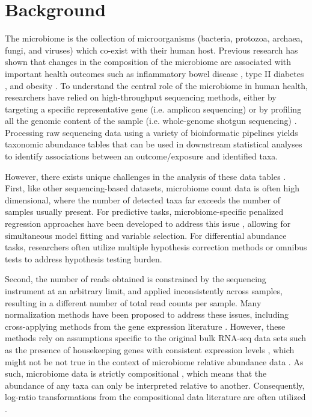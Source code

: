 \documentclass{article}
\begin{document}
\section*{Background}  
The microbiome is the collection of microorganisms (bacteria, protozoa, archaea, fungi, and viruses) which co-exist with their human host. Previous research has shown that changes in the composition of the microbiome are associated with important health outcomes such as inflammatory bowel disease \cite{proctor2019}, type II diabetes \cite{sharma2019}, and obesity \cite{aoun2020}. To understand the central role of the microbiome in human health, researchers have relied on high-throughput sequencing methods, either by targeting a specific representative gene (i.e. amplicon sequencing) or by profiling all the genomic content of the sample (i.e. whole-genome shotgun sequencing) \cite{cho2012}. Processing raw sequencing data using a variety of bioinformatic pipelines \cite{callahan2016,truong2015} yields taxonomic abundance tables that can be used in downstream statistical analyses to identify associations between an outcome/exposure and identified taxa.  

However, there exists unique challenges in the analysis of these data tables \cite{li2019,li2015}. First, like other sequencing-based datasets, microbiome count data is often high dimensional, where the number of detected taxa far exceeds the number of samples usually present. For predictive tasks, microbiome-specific penalized regression approaches have been developed to address this issue \cite{shi2016}, allowing for simultaneous model fitting and variable selection. For differential abundance tasks, researchers often utilize multiple hypothesis correction methods \cite{sankaran2014,benjamini1995} or omnibus tests \cite{chen2018} to address hypothesis testing burden. 

Second, the number of reads obtained is constrained by the sequencing instrument at an arbitrary limit, and applied inconsistently across samples, resulting in a different number of total read counts per sample. Many normalization methods \cite{weiss2017} have been proposed to address these issues, including cross-applying methods from the gene expression literature \cite{mcmurdie2014}. However, these methods rely on assumptions specific to the original bulk RNA-seq data sets such as the presence of housekeeping genes with consistent expression levels \cite{love2014}, which might not be not true in the context of microbiome relative abundance data \cite{quinn2019,quinn2018b}. As such, microbiome data is strictly compositional \cite{gloor2017}, which means that the abundance of any taxa can only be interpreted relative to another. Consequently, log-ratio transformations from the compositional data literature are often utilized \cite{aitchison1999}. 
\end{document}
